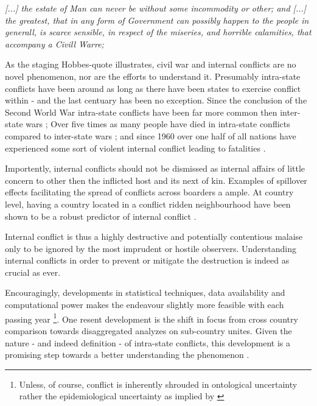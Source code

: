 \documentclass[a4paper]{article}
\begin{document}
\begin{displayquote}
\emph{[...] the estate of Man can never be without some incommodity or other; and [...] the greatest, that in any form of Government can possibly happen to the people in generall, is scarce sensible, in respect of the miseries, and horrible calamities, that accompany a Civill Warre;} \cite[128]{Hobbes_1991}  \par

\end{displayquote}

As the staging Hobbes-quote illustrates, civil war and internal conflicts are no novel phenomenon, nor are the efforts to understand it. Presumably intra-state conflicts have been around as long as there have been states to exercise conflict within - and the last centuary has been no exception. Since the conclusion of the Second World War intra-state conflicts have been far more common then inter-state wars \citep[563]{Collier_Hoeffler_2004}; Over five times as many people have died in intra-state conflicts compared to inter-state wars \citep[563]{Collier_Hoeffler_2004}; and since 1960 over one half of all nations have experienced some sort of violent internal conflict leading to fatalities \citep[3-4]{Blattman_Miguel_2010}.\par

Importently, internal conflicts should not be dismissed as internal affairs of little concern to other then the inflicted host and its next of kin. Examples of spillover effects facilitating the spread of conflicts across boarders a ample. At country level, having a country located in a conflict ridden neighbourhood have been shown to be a robust predictor of internal conflict \citep{Hegre_Sambanis_2006,Goldstone_2010}.\par

Internal conflict is thus a highly destructive and potentially contentious malaise only to be ignored by the most imprudent or hostile observers. Understanding internal conflicts in order to prevent or mitigate the destruction is indeed as crucial as ever.\par

Encouragingly, developments in statistical techniques, data availability and computational power makes the endeavour slightly more feasible with each passing year \footnote{Unless, of course, conflict is inherently shrouded in ontological uncertainty rather the epidemiological uncertainty as implied by \cite{Gartzke_1999}}. One resent development is the shift in focus from cross country comparison towards disaggregated analyzes on sub-country unites. Given the nature - and indeed definition - of intra-state conflicts, this development is a promising step towards a better understanding the phenomenon \citep{Cederman_Gleditsch_2009}. 
\end{document}
